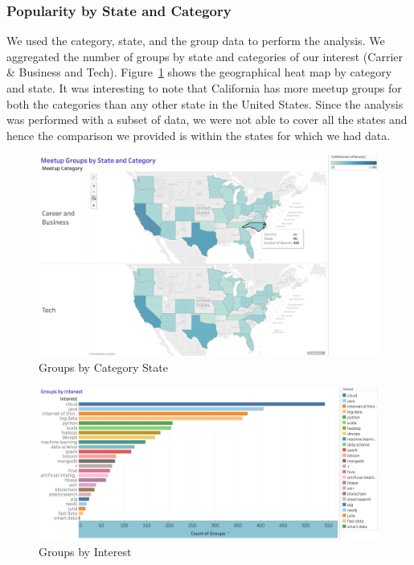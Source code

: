 \documentclass{acm_proc_article-sp}
\begin{document}
\subsubsection{Popularity by State and Category}
We used the category, state, and the group data to perform the analysis.  We aggregated the number of groups by state and categories of our interest (Carrier \& Business and Tech).  Figure~\ref{F:groupbycat} shows the geographical heat map by category and state.  It was interesting to note that California has more meetup groups for both the categories than any other state in the United States.  Since the analysis was performed with a subset of data, we were not able to cover all the states and hence the comparison we provided is within the states for which we had data.
\begin{figure}[p]
  \centering
      \includegraphics[width=0.9\linewidth]{images/tableau_images/groups_by_category_state.png}
  \caption{Groups by Category State}\label{F:groupbycat}
\end{figure}

\begin{figure}[p]
  \centering
      \includegraphics[width=0.9\linewidth]{images/tableau_images/groups_by_interest.png}
  \caption{Groups by Interest}\label{F:groupsbyint}
\end{figure}
\end{document}
